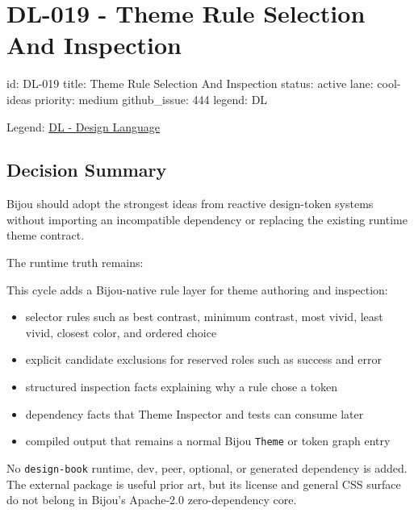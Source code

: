 \chapter{DL-019 - Theme Rule Selection And Inspection}\label{record-184}

\smallskip

\begin{RecordMeta}
id: DL-019
title: Theme Rule Selection And Inspection
status: active
lane: cool-ideas
priority: medium
github_issue: 444
legend: DL

\end{RecordMeta}

Legend: \href{https://github.com/flyingrobots/bijou/blob/1853ad902f6bf219326409e7f743a5a1d6517dbc/docs/legends/DL-design-language.md}{DL - Design Language}

\section{Decision Summary}\label{record-184-decision-summary}

Bijou should adopt the strongest ideas from reactive design-token systems without importing an incompatible dependency or replacing the existing runtime theme contract.

The runtime truth remains:



This cycle adds a Bijou-native rule layer for theme authoring and inspection:

\begin{itemize}
\tightlist
\item
  selector rules such as best contrast, minimum contrast, most vivid, least vivid, closest color, and ordered choice
\item
  explicit candidate exclusions for reserved roles such as success and error
\item
  structured inspection facts explaining why a rule chose a token
\item
  dependency facts that Theme Inspector and tests can consume later
\item
  compiled output that remains a normal Bijou \texttt{T\allowbreak{}h\allowbreak{}e\allowbreak{}m\allowbreak{}e} or token graph entry
\end{itemize}

No \texttt{d\allowbreak{}e\allowbreak{}s\allowbreak{}i\allowbreak{}g\allowbreak{}n\allowbreak{}-\allowbreak{}b\allowbreak{}o\allowbreak{}o\allowbreak{}k} runtime, dev, peer, optional, or generated dependency is added. The external package is useful prior art, but its license and general CSS surface do not belong in Bijou's Apache-2.0 zero-dependency core.


